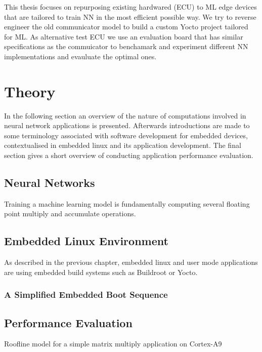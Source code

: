 This thesis focuses on repurposing existing hardwared (ECU) to ML edge devices that are tailored to train NN in the most efficient possible way. We try to reverse engineer the old communicator model to build a custom Yocto project tailored for ML. As alternative test ECU we use an evaluation board that has similar specifications as the commuicator to benchamark and experiment different NN implementations and evauluate the optimal ones.



\chapter{Theory}

In the following section an overview of the nature of computations involved in neural network applications is presented. Afterwards introductions are made to some terminology associated with software development for embedded devices, contextualised in embedded linux and its application development. The final section gives a short overview of conducting application performance evaluation.

\section{Neural Networks}

Training a machine learning model is fundamentally computing several floating point multiply and accumulate operations.

\section{Embedded Linux Environment}

As described in the previous chapter, embedded linux and user mode applications are using embedded build systems such as Buildroot or Yocto.

\subsection{A Simplified Embedded Boot Sequence}

\section{Performance Evaluation}

Roofline model for a simple matrix multiply application on Cortex-A9
